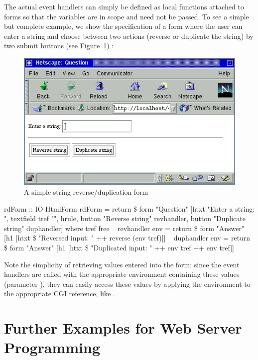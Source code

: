 The actual event handlers can simply be defined as local functions
attached to forms so that the  variables are in scope
and need not be passed.
To see a simple but complete example, we show the specification of
a form where the user can enter a string and choose between two
actions (reverse or duplicate the string) by two submit buttons
(see Figure~\ref{fig-revdup}) :
%
\begin{figure}[t]
\begin{center}
\includegraphics[scale=0.8]{PICTURES/revdup.jpg}
\end{center}\vspace{-3ex}
\caption{A simple string reverse/duplication form\label{fig-revdup}}
\end{figure}
%
\begin{prog}
rdForm :: IO HtmlForm
rdForm = return \$ form "Question"
           [htxt "Enter a string: ", textfield tref "", hrule,
            button "Reverse string"   revhandler,
            button "Duplicate string" duphandler]
 where
   tref free
~
   revhandler env = return \$ form "Answer"
     [h1 [htxt \$ "Reversed input: " ++ reverse (env tref)]]
~
   duphandler env = return \$ form "Answer"
     [h1 [htxt \$ "Duplicated input: " ++ env tref ++ env tref]]
\end{prog}
%
Note the simplicity of retrieving values entered into the form:
since the event handlers are called with the appropriate environment
containing these values (parameter ),
they can easily access these values
by applying the environment to the appropriate CGI reference,
like .


\section{Further Examples for Web Server Programming}

